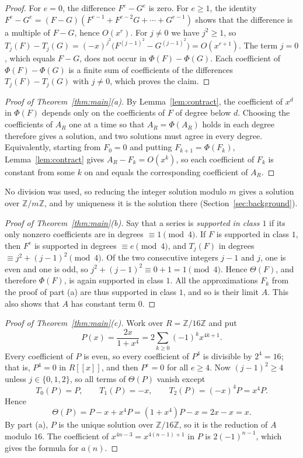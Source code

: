 \documentclass[11pt,a4paper]{article}
\theoremstyle{definition}
\theoremstyle{remark}
\newcommand{\Z}{\mathbb{Z}}
\newcommand{\ps}[1]{#1[[x]]}
\begin{document}
\begin{proof}
For $e=0$, the difference $F^e-G^e$ is zero. For $e\ge1$, the identity
$F^e-G^e=(F-G)(F^{e-1}+F^{e-2}G+\cdots+G^{e-1})$ shows that the difference is a multiple of $F-G$, hence $O(x^r)$. For
$j\neq0$ we have $j^2\ge1$, so $T_j(F)-T_j(G)=(-x)^{j^2}\bigl(F^{(j-1)^2}-G^{(j-1)^2}\bigr)=O(x^{r+1})$. The term
$j=0$, which equals $F-G$, does not occur in $\Phi(F)-\Phi(G)$. Each coefficient of $\Phi(F)-\Phi(G)$ is a finite sum of
coefficients of the differences $T_j(F)-T_j(G)$ with $j\ne0$, which proves the claim.
\end{proof}

\begin{proof}[Proof of Theorem~\ref{thm:main}(a)]
By Lemma~\ref{lem:contract}, the coefficient of $x^d$ in $\Phi(F)$ depends only on the coefficients of $F$ of degree
below $d$. Choosing the coefficients of $A_R$ one at a time so that $A_R=\Phi(A_R)$ holds in each degree therefore gives
a solution, and two solutions must agree in every degree. Equivalently, starting from $F_0=0$ and putting
$F_{k+1}=\Phi(F_k)$, Lemma~\ref{lem:contract} gives $A_R-F_k=O(x^k)$, so each coefficient of $F_k$ is constant from
some $k$ on and equals the corresponding coefficient of $A_R$.
\end{proof}

No division was used, so reducing the integer solution modulo $m$ gives a solution over $\Z/m\Z$, and by uniqueness it
is the solution there (Section~\ref{sec:background}).

\begin{proof}[Proof of Theorem~\ref{thm:main}(b)]
Say that a series is \emph{supported in class $1$} if its only nonzero coefficients are in degrees $\equiv1\pmod4$. If
$F$ is supported in class $1$, then $F^e$ is supported in degrees $\equiv e\pmod4$, and $T_j(F)$ in degrees
$\equiv j^2+(j-1)^2\pmod4$. Of the two consecutive integers $j-1$ and $j$, one is even and one is odd, so
$j^2+(j-1)^2\equiv0+1=1\pmod4$. Hence $\Theta(F)$, and therefore $\Phi(F)$, is again supported in class $1$. All the
approximations $F_k$ from the proof of part (a) are thus supported in class $1$, and so is their limit $A$. This also
shows that $A$ has constant term $0$.
\end{proof}

\begin{proof}[Proof of Theorem~\ref{thm:main}(c)]
Work over $R=\Z/16\Z$ and put
\[
P(x)=\frac{2x}{1+x^4}=2\sum_{k\ge0}(-1)^kx^{4k+1}.
\]
Every coefficient of $P$ is even, so every coefficient of $P^4$ is divisible by $2^4=16$; that is, $P^4=0$ in $\ps{R}$,
and then $P^e=0$ for all $e\ge4$. Now $(j-1)^2\ge4$ unless $j\in\{0,1,2\}$, so all terms of $\Theta(P)$ vanish except
\[
T_0(P)=P,\qquad T_1(P)=-x,\qquad T_2(P)=(-x)^4P=x^4P .
\]
Hence
\[
\Theta(P)=P-x+x^4P=(1+x^4)P-x=2x-x=x .
\]
By part (a), $P$ is the unique solution over $\Z/16\Z$, so it is the reduction of $A$ modulo $16$. The coefficient of
$x^{4n-3}=x^{4(n-1)+1}$ in $P$ is $2(-1)^{n-1}$, which gives the formula for $a(n)$.
\end{proof}
\end{document}
